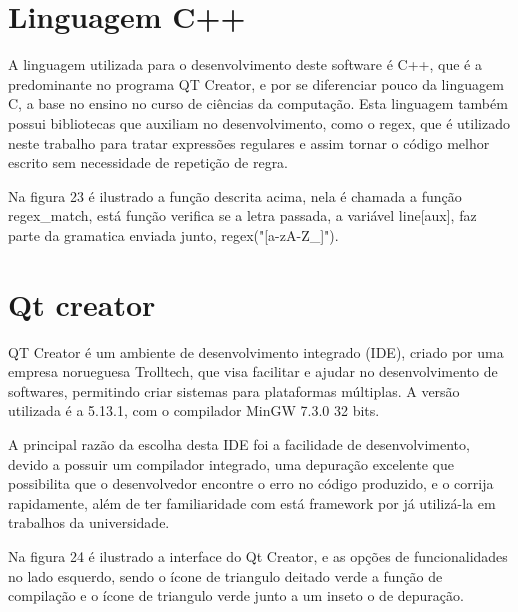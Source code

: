\documentclass[12pt,oneside,a4paper,chapter=TITLE,section=TITLE,sumario=tradicional]{abntex2}
\begin{document}
\section{Linguagem C++}
\label{sec:linugagemc++}

A linguagem utilizada para o desenvolvimento deste software é C++, que é a predominante no programa QT Creator, e por se diferenciar pouco da linguagem C, a base no ensino no curso de ciências da computação. Esta linguagem também possui bibliotecas que auxiliam no desenvolvimento, como o regex, que é utilizado neste trabalho para tratar expressões regulares e assim tornar o código melhor escrito sem necessidade de repetição de regra.

Na figura 23 é ilustrado a função descrita acima, nela é chamada a função regex\_match, está função verifica se a letra passada, a variável line[aux], faz parte da gramatica enviada junto, regex("[a-zA-Z\_]").

\begin{figure}[htb]
\end{figure} 

\section{Qt creator}
\label{sec:qtcreator}

QT Creator é um ambiente de desenvolvimento integrado (IDE), criado por uma empresa norueguesa Trolltech, que visa facilitar e ajudar no desenvolvimento de softwares, permitindo criar sistemas para plataformas múltiplas. A versão utilizada é a 5.13.1, com o compilador MinGW 7.3.0 32 bits. 

A principal razão da escolha desta IDE foi a facilidade de desenvolvimento, devido a possuir um compilador integrado, uma depuração excelente que possibilita que o desenvolvedor encontre o erro no código produzido, e o corrija rapidamente, além de ter familiaridade com está framework por já utilizá-la em trabalhos da universidade. 

Na figura 24 é ilustrado a interface do Qt Creator, e as opções de funcionalidades no lado esquerdo, sendo o ícone de triangulo deitado verde a função de compilação e o ícone de triangulo verde junto a um inseto o de depuração.

\begin{figure}[htb]
\end{figure} 
\end{document}
